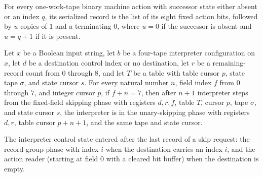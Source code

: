 \begin{lemma}
\label{Turing.universal_record_shape}
\leanok
{}
For every one-work-tape binary machine action with successor state either absent or an
index $q$, its serialized record is the list of its eight fixed action bits, followed by
$u$ copies of $1$ and a terminating $0$, where $u=0$ if the successor is absent and
$u=q+1$ if it is present.
\end{lemma}

\begin{lemma}
\label{Turing.universal_skip_fixed}
\leanok
{}
Let $x$ be a Boolean input string, let $b$ be a four-tape interpreter configuration on
$x$, let $d$ be a destination control index or no destination, let $r$ be a
remaining-record count from $0$ through $8$, and let $T$ be a table with table cursor
$p$, state tape $\sigma$, and state cursor $s$. For every natural number $n$, field
index $f$ from $0$ through $7$, and integer cursor $p$, if $f+n=7$, then after $n+1$
interpreter steps from the fixed-field skipping phase with registers $d,r,f$, table $T$,
cursor $p$, tape $\sigma$, and state cursor $s$, the interpreter is in the
unary-skipping phase with registers $d,r$, table cursor $p+n+1$, and the same tape and
state cursor.
\end{lemma}

\begin{definition}
\label{Turing.universalSkipDone}
\leanok
{}
The interpreter control state entered after the last record of a skip
request: the record-group phase with index $i$ when the destination carries
an index $i$, and the action reader (starting at field $0$ with a cleared bit
buffer) when the destination is empty.
\end{definition}
